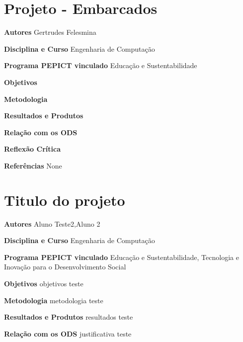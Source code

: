 \documentclass[12pt,openright,oneside,a4paper]{report}
\begin{document}
\section{Projeto - Embarcados}
\noindent
\textbf{Autores}
Gertrudes Felesmina

\vspace{0.7cm}
\noindent
\textbf{Disciplina e Curso}
Engenharia de Computação

\vspace{0.7cm}
\noindent
\textbf{Programa PEPICT vinculado}
Educação e Sustentabilidade

\vspace{0.7cm}
\noindent
\textbf{Objetivos}


\vspace{0.7cm}
\noindent
\textbf{Metodologia}


\vspace{0.7cm}
\noindent
\textbf{Resultados e Produtos}


\vspace{0.7cm}
\noindent
\textbf{Relação com os ODS}


\vspace{0.7cm}
\noindent
\textbf{Reflexão Crítica}


\vspace{0.7cm}
\noindent
\textbf{Referências}
None

\vspace{0.7cm}
\section{Titulo do projeto}
\noindent
\textbf{Autores}
Aluno Teste2,Aluno 2

\vspace{0.7cm}
\noindent
\textbf{Disciplina e Curso}
Engenharia de Computação

\vspace{0.7cm}
\noindent
\textbf{Programa PEPICT vinculado}
Educação e Sustentabilidade, Tecnologia e Inovação para o Desenvolvimento Social

\vspace{0.7cm}
\noindent
\textbf{Objetivos}
objetivos teste

\vspace{0.7cm}
\noindent
\textbf{Metodologia}
metodologia teste

\vspace{0.7cm}
\noindent
\textbf{Resultados e Produtos}
resultados teste

\vspace{0.7cm}
\noindent
\textbf{Relação com os ODS}
justificativa teste
\end{document}
